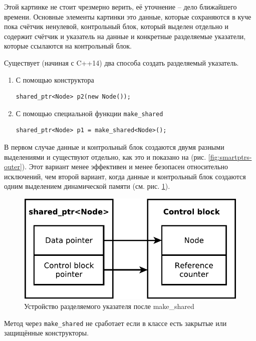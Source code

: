\documentclass[a4paper,12pt,oneside]{article}
\begin{document}
Этой картинке не стоит чрезмерно верить, её уточнение -- дело ближайшего времени. Основные элементы картинки это данные, которые сохраняются в куче пока счётчик ненулевой, контрольный блок, который выделен отдельно и содержит счётчик и указатель на данные и конкретные разделяемые указатели, которые ссылаются на контрольный блок.

Существует (начиная с C++14) два способа создать разделяемый указатель.

\begin{enumerate}
\item С помощью конструктора 
\begin{lstlisting}
shared_ptr<Node> p2(new Node());
\end{lstlisting}
\item С помощью специальной функции \lstinline!make_shared!
\begin{lstlisting}
shared_ptr<Node> p1 = make_shared<Node>();
\end{lstlisting}
\end{enumerate}

В первом случае данные и контрольный блок создаются двумя разными выделениями и существуют отдельно, как это и показано на (рис. \ref{fig:smartptrs-outer}). Этот вариант менее эффективен и менее безопасен относительно исключений, чем второй вариант, когда данные и контрольный блок создаются одним выделением динамической памяти (см. рис. \ref{fig:smartptrs-inner}).

\begin{figure}[ht]
\centering
\includegraphics[width=1.0\textwidth]{illustrations/smartptrs-inner-crop.pdf}
\caption{Устройство разделяемого указателя после make\_shared}
\label{fig:smartptrs-inner}
\end{figure}

Метод через \lstinline!make_shared! не сработает если в классе есть закрытые или защищённые конструкторы.
\end{document}
